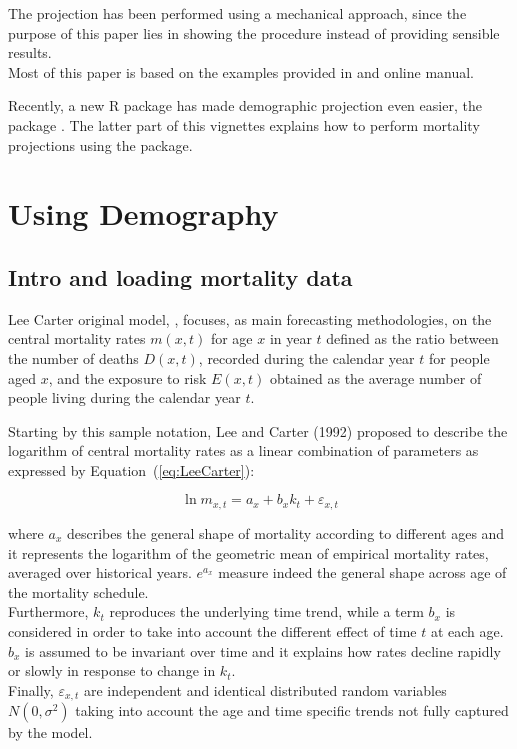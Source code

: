 \documentclass[nojss]{jss}
\begin{document}
The projection has been performed using a mechanical approach, since the purpose of this paper lies in showing the procedure instead of providing sensible results.\\
Most of this paper is based on the examples provided in \cite{rmetrics1} and \cite{charpentierDutang} online manual.

Recently, a new R package has made demographic projection even easier, the  package \cite{pkg:StMoMo}. The latter part of this vignettes explains how to perform mortality projections using the  package.

\section{Using Demography}

\subsection{Intro and loading mortality data}

Lee Carter original model, \cite{Lee1992}, focuses, as main forecasting methodologies, on the central mortality rates $m(x,t)$ for age $x$ in year $t$ defined as the ratio between the number of deaths $D(x,t)$, recorded during the calendar year $t$ for people aged $x$, and the exposure to risk $E(x,t)$ obtained as the average number of people living during the calendar year $t$.

Starting by this sample notation, Lee and Carter (1992) proposed to describe the logarithm of central mortality rates as a linear combination of parameters as expressed by Equation~(\ref{eq:LeeCarter}):

\begin{equation}
\ln m_{x,t} = a_{x} + b_{x} k_{t} + \varepsilon_{x,t}
\label{eq:LeeCarter}
\end{equation}

where $a_{x}$ describes the general shape of mortality according to different ages and it represents the logarithm of the geometric mean of empirical mortality rates, averaged over historical years. $e^{a_{x}}$ measure indeed the general shape across age of the mortality schedule. \\
Furthermore, $k_{t}$ reproduces the underlying time trend, while a term $b_{x}$ is considered in order to take into account the different effect of time $t$ at each age. 
$b_{x}$ is assumed to be invariant over time and it explains how rates decline rapidly or slowly in response to change in $k_{t}$. \\  
Finally, $\varepsilon_{x,t}$ are independent and identical distributed random variables $N(0,\sigma^{2})$ taking into account the age and time specific trends not fully captured by the model. \\
\end{document}
